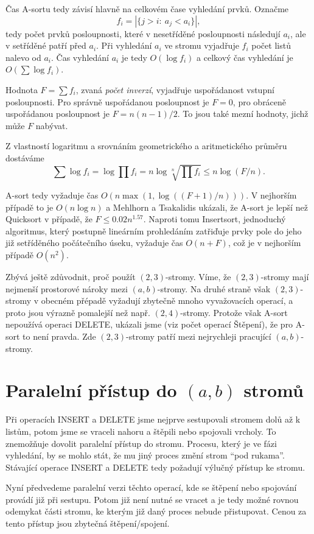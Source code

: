 Čas A-sortu tedy závisí hlavně na celkovém čase vyhledání prvků.
Označme
\[
f_i = |\{ j > i:\ a_j < a_i \}|,
\]
tedy počet prvků posloupnosti, které v nesetříděné posloupnosti
následují $a_i$, ale v setříděné patří před $a_i$. Při vyhledání $a_i$
ve stromu vyjadřuje $f_i$ počet listů nalevo od $a_i$. Čas
vyhledání $a_i$ je tedy $O(\log f_i)$ a celkový čas vyhledání je 
$O(\sum \log f_i)$.

Hodnota $F = \sum f_i$, zvaná 
\emph{počet inverzí}, %
vyjadřuje uspořádanost vstupní
posloupnosti. Pro správně uspořádanou posloupnost je $F = 0$, pro
obráceně uspořádanou posloupnost je $F = n (n-1) / 2$. To jsou také
mezní hodnoty, jichž může $F$ nabývat.

Z vlastností logaritmu a srovnáním geometrického a aritmetického
průměru dostáváme
\[
\sum \log f_i = \log \prod f_i = n \log \sqrt[n]{\prod f_i}
\leq n \log (F/n).
\]

A-sort tedy vyžaduje čas $O(n \max(1, \log((F+1)/n)))$. V nejhorším
případě to je $O(n \log n)$ a Mehlhorn a Tsakalidis ukázali, že A-sort
je lepší než Quicksort v případě, že $F \leq 0.02 n^{1.57}$.
Naproti tomu Insertsort, jednoduchý algoritmus, který postupně
lineárním prohledáním zatřiďuje prvky pole do jeho již setříděného
počátečního úseku, vyžaduje čas $O(n + F)$, což je v nejhorším případě
$O(n^2)$.

Zbývá ještě zdůvodnit, proč použít $(2,3)$-stromy. Víme, že $(2,3)$-stromy 
mají nejmenší prostorové nároky mezi $(a,b)$-stromy. Na druhé straně však 
$(2,3)$-stromy v obecném přépadě vyžadují zbytečně mnoho vyvažovacích 
operací, a proto jsou výrazně pomalejší než např. $(2,4)$-stromy. Protože 
však A-sort nepoužívá operaci DELETE, ukázali jsme (viz počet operací 
Štěpení), že pro A-sort to není pravda. Zde $(2,3)$-stromy patří mezi 
nejrychleji pracující $(a,b)$-stromy.

\section{Paralelní přístup do $(a,b)$ stromů}

Při operacích INSERT a DELETE jsme nejprve sestupovali stromem dolů až
k listům, potom jsme se vraceli nahoru a štěpili nebo spojovali
vrcholy. To znemožňuje dovolit paralelní přístup do stromu. Procesu,
který je ve fázi vyhledání, by se mohlo stát, že mu jiný proces změní
strom ``pod rukama''. Stávající operace INSERT a DELETE tedy požadují
výlučný přístup ke stromu.
\par
Nyní předvedeme paralelní verzi těchto operací, kde se štěpení nebo
spojování provádí již při sestupu. Potom již není nutné se vracet a je
tedy možné rovnou odemykat části stromu, ke kterým již daný proces
nebude přistupovat. Cenou za tento přístup jsou zbytečná
štěpení/spojení.

